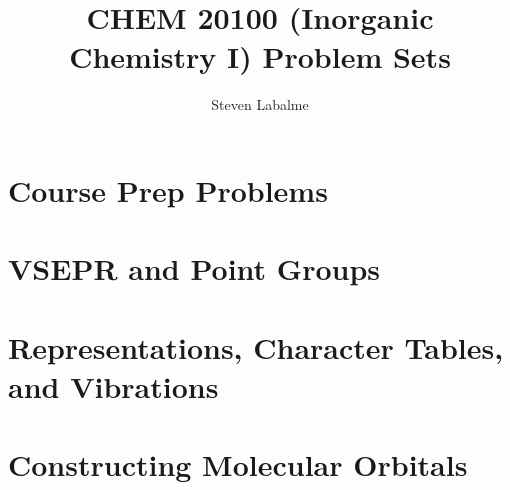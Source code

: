 \documentclass[titlepage]{article}
\title{CHEM 20100 (Inorganic Chemistry I) Problem Sets}
\author{Steven Labalme}
\begin{document}
\maketitle



\tableofcontents
\newpage



\pagestyle{main}
\renewcommand{\leftmark}{Problem Set \thesection}
\setcounter{section}{-1}
\section{Course Prep Problems}

\newpage



\section{VSEPR and Point Groups}

\newpage



\section{Representations, Character Tables, and Vibrations}

\newpage



\section{Constructing Molecular Orbitals}

\end{document}
